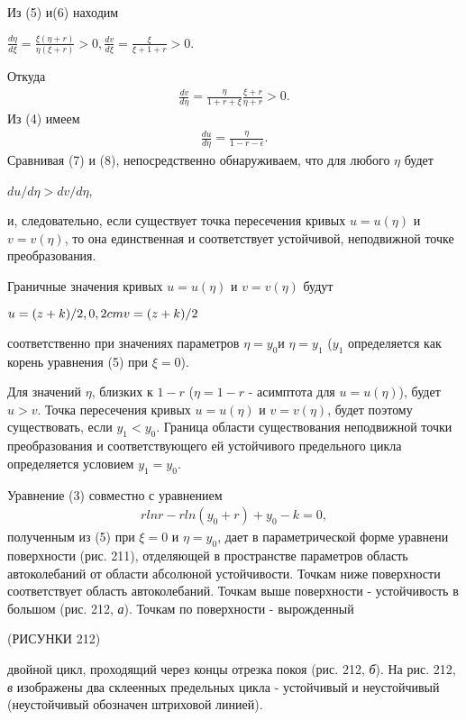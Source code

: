 \documentclass{article}
\begin{document}
Из (5) и(6) находим
\begin{center}
$\frac{d\eta}{d\xi}=\frac{\xi(\eta+r)}{\eta(\xi+r)}> 0, \frac{dv}{d\xi}=\frac{\xi}{\xi+1+r}>0.$
\end{center}
Откуда
\begin{gather}
\frac{dv}{d\eta}=\frac{\eta}{1+r+\xi}\frac{\xi+r}{\eta+r}>0.
\end{gather}
Из (4) имеем\\%
\begin{gather}
\frac{du}{d\eta}=\frac{\eta}{1-r-\epsilon}.
\end{gather}
Сравнивая (7) и (8), непосредственно обнаруживаем, что для
любого $\eta$ будет
\begin{center}
$du/d\eta>dv/d\eta$,
\end{center}
и, следовательно, если существует точка пересечения кривых
$u=u(\eta)$ и $v=v(\eta)$, то она единственная и соответствует устойчивой,
неподвижной точке преобразования.

Граничные значения кривых $u=u(\eta)$ и $v=v(\eta)$ будут
\begin{center}
$u=(z+k)/2, \space{0,2cm} v=(z+k)/2$
\end{center}
соответственно при значениях параметров $\eta=y_{0}$и $\eta=y_{1}$ ($y_{1}$ определяется 
как корень уравнения (5) при $\xi=0$).

Для значений $\eta$, близких к $1-r$ ($ \eta=1-r$ - асимптота для
$u=u(\eta)$), будет $u>v$. Точка пересечения кривых $u=u(\eta)$ и
$v=v(\eta)$, будет поэтому существовать,
если $y_{1}<y_{0}$. Граница области существования
неподвижной точки преобразования
и соответствующего ей устойчивого
предельного цикла определяется
условием $y_{1}=y_{0}$.

Уравнение (3) совместно с уравнением
\begin{gather}
r ln r-r ln(y_{0}+r)+y_{0}-k=0,
\end{gather}
полученным из (5) при $\xi=0$ и $\eta=y_{0}$,
дает в параметрической форме уравнени
поверхности (рис. 211), отделяющей в пространстве параметров
область автоколебаний от области абсолюной устойчивости.
Точкам ниже поверхности соответствует область
автоколебаний. Точкам выше поверхности - устойчивость
в большом (рис. 212, \textit{а}). Точкам по поверхности - вырожденный

(РИСУНКИ 212)

двойной цикл, проходящий через концы отрезка покоя
(рис. 212, \textit{б}). На рис. 212, \textit{в} изображены два склеенных предельных
цикла - устойчивый и неустойчивый (неустойчивый обозначен
штриховой линией).
\end{document}

